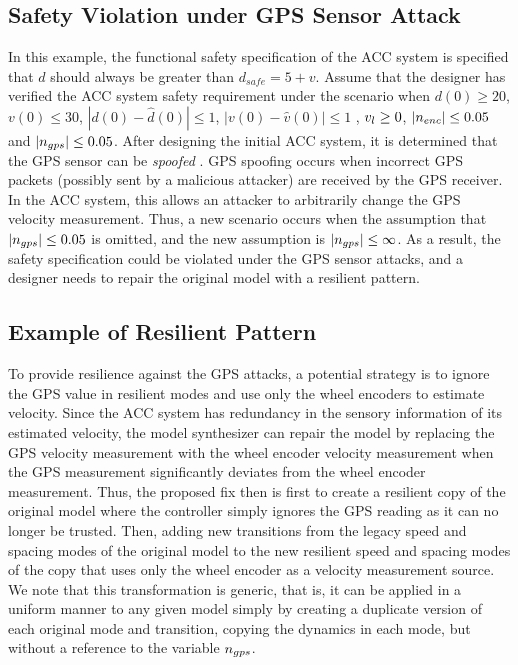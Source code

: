 \subsection{Safety Violation under GPS Sensor Attack}
%
In this example, the functional safety specification of the ACC system is specified that $d$ should always be greater than $d_{safe} = 5 + v$. Assume that the designer has verified the ACC system safety requirement under the scenario when $d(0) \geq 20$, $v(0) \leq 30$, $|d(0) - \hat{d}(0)| \leq 1$, $|v(0) - \hat{v}(0)| \leq 1$ , $v_{l} \geq 0$, $|n_{enc}| \leq 0.05$ and $|n_{gps}| \leq 0.05$.
%
After designing the initial ACC system, it is determined that the GPS sensor can be \emph{spoofed} \cite{tippenhauer2011requirements, kerns2014unmanned}. GPS spoofing occurs when incorrect GPS packets (possibly sent by a malicious attacker) are received by the GPS receiver. In the ACC system, this allows an attacker to arbitrarily change the GPS velocity measurement. 
%
Thus, a new scenario occurs when the assumption that $|n_{gps}| \leq 0.05$ is omitted, and the new assumption is $|n_{gps}| \leq \infty$.
As a result, the safety specification could be violated under the GPS sensor attacks, and a designer needs to repair the original model with a resilient pattern. 

\subsection{Example of Resilient Pattern}
%
%
To provide resilience against the GPS attacks, a potential strategy is to ignore the GPS value in resilient modes and use only the wheel encoders to estimate velocity. Since the ACC system has redundancy in the sensory information of its estimated velocity, the model synthesizer can repair the model by replacing the GPS velocity measurement with the wheel encoder velocity measurement when the GPS measurement significantly deviates from the wheel encoder measurement.
%
%
Thus, the proposed fix then is first to create a resilient copy of the original model where the controller simply ignores the GPS reading as it can no longer be trusted. Then, adding new transitions from the legacy speed and spacing modes of the original model to the new resilient speed and spacing modes of the copy that uses only the wheel encoder as a velocity measurement source. We note that this transformation is generic, that is, it can be applied in a uniform manner to any given model simply by creating a duplicate version of each original mode and transition, copying the dynamics in each mode, but without a reference to the variable $n_{gps}$. 

